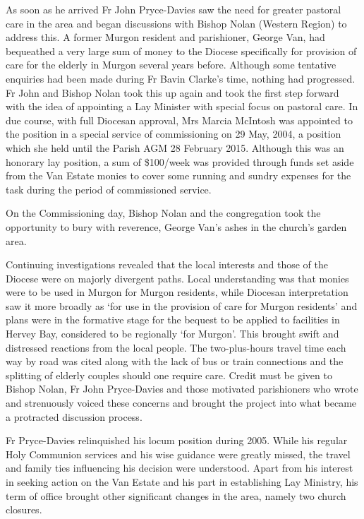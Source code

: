 As soon as he arrived Fr John Pryce-Davies saw the need for greater pastoral care in the area and began discussions with Bishop Nolan (Western Region) to address this. A former Murgon resident and parishioner, George Van, had bequeathed a very large sum of money to the Diocese specifically for provision of care for the elderly in Murgon several years before. Although some tentative enquiries had been made during Fr Bavin Clarke's time, nothing had progressed. Fr John and Bishop Nolan took this up again and took the first step forward with the idea of appointing a Lay Minister with special focus on pastoral care. In due course, with full Diocesan approval, Mrs Marcia McIntosh was appointed to the position in a special service of commissioning on 29 May, 2004, a position which she held until the Parish AGM 28 February 2015. Although this was an honorary lay position, a sum of \$100/week was provided through funds set aside from the Van Estate monies to cover some running and sundry expenses for the task during the period of commissioned service.



On the Commissioning day, Bishop Nolan and the congregation took the opportunity to bury with reverence, George Van's ashes in the church's garden area.



Continuing investigations revealed that the local interests and those of the Diocese were on majorly divergent paths. Local understanding was that monies were to be used in Murgon for Murgon residents, while Diocesan interpretation saw it more broadly as `for use in the provision of care for Murgon residents' and plans were in the formative stage for the bequest to be applied to facilities in Hervey Bay, considered to be regionally `for Murgon'. This brought swift and distressed reactions from the local people. The two-plus-hours travel time each way by road was cited along with the lack of bus or train connections and the splitting of elderly couples should one require care. Credit must be given to Bishop Nolan, Fr John Pryce-Davies and those motivated parishioners who wrote and strenuously voiced these concerns and brought the project into what became a protracted discussion process.



Fr Pryce-Davies relinquished his locum position during 2005. While his regular Holy Communion services and his wise guidance were greatly missed, the travel and family ties influencing his decision were understood. Apart from his interest in seeking action on the Van Estate and his part in establishing Lay Ministry, his term of office brought other significant changes in the area, namely two church closures.



